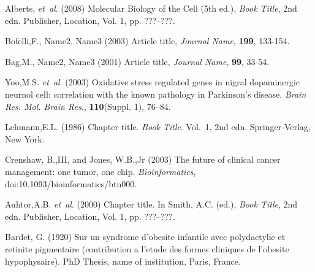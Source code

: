 \documentclass{bioinfo}
\begin{document}
\begin{thebibliography}{}

Alberts, \textit{et~al}. (2008) Molecular Biology of the Cell
(5th ed.), \textit{Book Title}, 2nd edn. Publisher, Location, Vol. 1, pp.
???--???.



Bofelli,F., Name2, Name3 (2003) Article title, {\it Journal Name}, {\bf 199}, 133-154.

Bag,M., Name2, Name3 (2001) Article title, {\it Journal Name}, {\bf 99}, 33-54.

Yoo,M.S. \textit{et~al}. (2003) Oxidative stress regulated genes
in nigral dopaminergic neurnol cell: correlation with the known
pathology in Parkinson's disease. \textit{Brain Res. Mol. Brain
Res.}, \textbf{110}(Suppl. 1), 76--84.

Lehmann,E.L. (1986) Chapter title. \textit{Book Title}. Vol.~1, 2nd edn. Springer-Verlag, New York.

Crenshaw, B.,III, and Jones, W.B.,Jr (2003) The future of clinical
cancer management: one tumor, one chip. \textit{Bioinformatics},
doi:10.1093/bioinformatics/btn000.

Auhtor,A.B. \textit{et~al}. (2000) Chapter title. In Smith, A.C.
(ed.), \textit{Book Title}, 2nd edn. Publisher, Location, Vol. 1, pp.
???--???.

Bardet, G. (1920) Sur un syndrome d'obesite infantile avec
polydactylie et retinite pigmentaire (contribution a l'etude des
formes cliniques de l'obesite hypophysaire). PhD Thesis, name of
institution, Paris, France.

\end{thebibliography}
\end{document}
